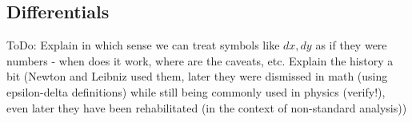 






\subsection{Differentials}
ToDo: Explain in which sense we can treat symbols like $dx, dy$ as if they were numbers - when does it work, where are the caveats, etc. Explain the history a bit (Newton and Leibniz used them, later they were dismissed in math (using epsilon-delta definitions) while still being commonly used in physics (verify!), even later they have been rehabilitated (in the context of non-standard analysis))


